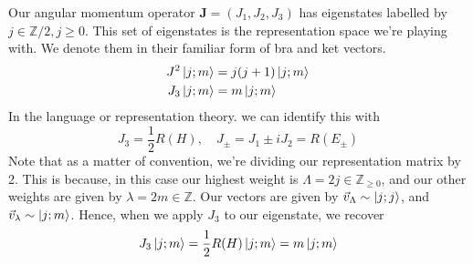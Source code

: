Our angular momentum operator $ \mathbf{ J } = ( J_1, J_2, J_3 ) $
has eigenstates labelled by $ j \in \mathbb{ Z} / 2 , j \geq 0 $.
This set of eigenstates is the representation space we're playing 
with. We denote them in their familiar form of 
bra and ket vectors. 
\begin{align*}
	J ^ 2 \ket{ j ; m } &=  j (  j + 1 ) \ket{ j ; m }  \\
	J_3 \ket{ j ; m } &=  m \ket{ j ; m } 
\end{align*}
In the language or representation theory. we can identify 
this with 
\[
	J_3 = \frac{1}{2 } R ( H ) , \quad
	J_{ \pm }  = J_1 \pm i J _2 = R ( E_{ \pm } ) 
\] Note that as a matter of convention, we're 
dividing our representation matrix by 2. This is because, in this case our highest weight is 
$ \Lambda =  2j \in \mathbb{ Z} _{ \geq 0 }$, and 
our other weights are given by $ \lambda = 2m \in \mathbb{ Z} $. 
Our vectors are given by  $ \vec{v}_{ \Lambda } \sim \ket{ j ; j }$, 
and $ \vec{v} _{ \lambda } \sim \ket{ j ; m } $. Hence, 
when we apply $ J _ 3 $ to our eigenstate, we recover 
\[
	J _ 3 \ket{ j ; m } = \frac{1}{2 } R ( H ) \ket{ j ; m }  = m \ket{ j ;  m } 
\] 

